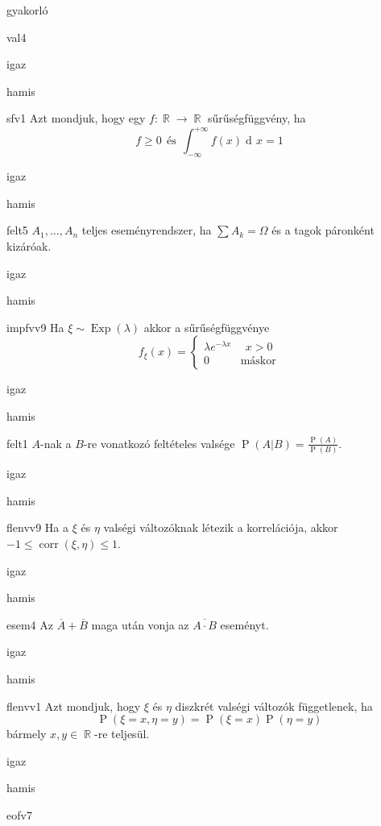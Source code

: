 \documentclass[12pt]{article}
\DeclareMathOperator{\Exp}{Exp}
\renewcommand{\P}{\operatorname{P}}
\DeclareMathOperator{\corr}{corr}
\renewcommand{\d}{\operatorname{d\! }} %
\DeclareMathOperator{\R}{\mathbb{R}}
\begin{document}
\begin{quiz}{gyakorló}
\begin{multi}{val4}
\item* igaz
\item hamis
\end{multi}
\begin{multi}{sfv1}
Azt mondjuk, hogy egy $f:\R\to \R$ sűrűségfüggvény, ha 
$$
f\ge 0 \ \ \text{és}\ \ \int_{-\infty}^{+\infty}f(x)\d x=1
$$
\item* igaz
\item hamis
\end{multi}
\begin{multi}{felt5}
$A_1,\ldots,A_n$ teljes eseményrendszer, ha $\sum A_k=\Omega$ és a tagok páronként kizáróak.
\item* igaz
\item hamis
\end{multi}
\begin{multi}{impfvv9}
Ha $\xi\sim \Exp(\lambda)$ akkor a sűrűségfüggvénye 
$$
f_{\xi}(x)=
\begin{cases}
\lambda e^{-\lambda x}& \ \ x>0\\
0 & \text{máskor} 
\end{cases}
$$
\item* igaz
\item hamis
\end{multi}
\begin{multi}{felt1}
$A$-nak a $B$-re vonatkozó feltételes valsége $\P(A|B)=\frac{\P(A)}{\P(B)}$.
\item igaz
\item* hamis
\end{multi}
\begin{multi}{flenvv9}
Ha a $\xi$ és $\eta$ valségi változóknak létezik a korrelációja, akkor $-1\le \corr(\xi,\eta)\le 1$.
\item* igaz
\item hamis
\end{multi}
\begin{multi}{esem4}
Az $\overline{A} + \overline{B}$ maga után vonja az $\overline{A\cdot B}$ eseményt.
\item* igaz
\item hamis
\end{multi}
\begin{multi}{flenvv1}
Azt mondjuk, hogy $\xi$ és $\eta$ diszkrét valségi változók függetlenek, ha
$$
\P(\xi=x,\eta=y)=\P(\xi=x)\P(\eta=y)
$$
bármely $x,y\in \R$-re teljesül.
\item* igaz
\item hamis
\end{multi}
\begin{multi}{eofv7}

\end{multi}
\end{quiz}
\end{document}
